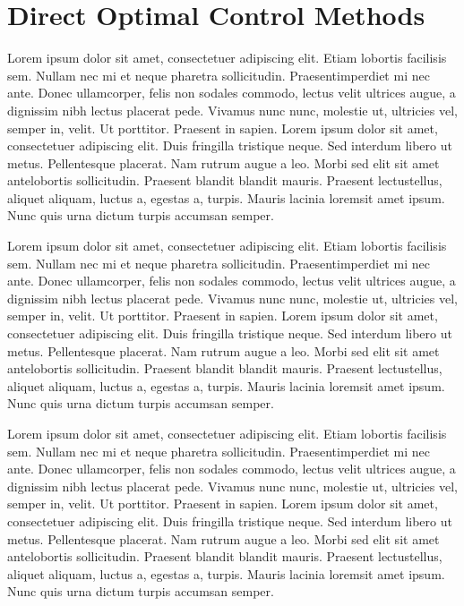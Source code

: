 \section{Direct Optimal Control Methods}

Lorem ipsum dolor sit amet, consectetuer adipiscing elit. Etiam lobortis facilisis sem. Nullam nec mi et neque pharetra sollicitudin. Praesentimperdiet mi nec ante. Donec ullamcorper, felis non sodales commodo, lectus velit ultrices augue, a dignissim nibh lectus placerat pede. Vivamus nunc nunc, molestie ut, ultricies vel, semper in, velit. Ut porttitor. Praesent in sapien. Lorem ipsum dolor sit amet, consectetuer adipiscing elit. Duis fringilla tristique neque. Sed interdum libero ut metus. Pellentesque placerat. Nam rutrum augue a leo. Morbi sed elit sit amet antelobortis sollicitudin. Praesent blandit blandit mauris. Praesent lectustellus, aliquet aliquam, luctus a, egestas a, turpis. Mauris lacinia loremsit amet ipsum. Nunc quis urna dictum turpis accumsan semper.

Lorem ipsum dolor sit amet, consectetuer adipiscing elit. Etiam lobortis facilisis sem. Nullam nec mi et neque pharetra sollicitudin. Praesentimperdiet mi nec ante. Donec ullamcorper, felis non sodales commodo, lectus velit ultrices augue, a dignissim nibh lectus placerat pede. Vivamus nunc nunc, molestie ut, ultricies vel, semper in, velit. Ut porttitor. Praesent in sapien. Lorem ipsum dolor sit amet, consectetuer adipiscing elit. Duis fringilla tristique neque. Sed interdum libero ut metus. Pellentesque placerat. Nam rutrum augue a leo. Morbi sed elit sit amet antelobortis sollicitudin. Praesent blandit blandit mauris. Praesent lectustellus, aliquet aliquam, luctus a, egestas a, turpis. Mauris lacinia loremsit amet ipsum. Nunc quis urna dictum turpis accumsan semper.

Lorem ipsum dolor sit amet, consectetuer adipiscing elit. Etiam lobortis facilisis sem. Nullam nec mi et neque pharetra sollicitudin. Praesentimperdiet mi nec ante. Donec ullamcorper, felis non sodales commodo, lectus velit ultrices augue, a dignissim nibh lectus placerat pede. Vivamus nunc nunc, molestie ut, ultricies vel, semper in, velit. Ut porttitor. Praesent in sapien. Lorem ipsum dolor sit amet, consectetuer adipiscing elit. Duis fringilla tristique neque. Sed interdum libero ut metus. Pellentesque placerat. Nam rutrum augue a leo. Morbi sed elit sit amet antelobortis sollicitudin. Praesent blandit blandit mauris. Praesent lectustellus, aliquet aliquam, luctus a, egestas a, turpis. Mauris lacinia loremsit amet ipsum. Nunc quis urna dictum turpis accumsan semper.

